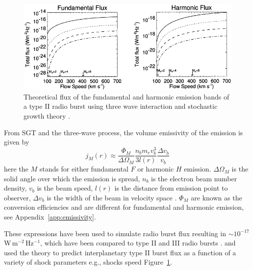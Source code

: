 \begin{figure}[t!]
\begin{center}
\includegraphics[scale=1.1, trim=0cm 0cm 0cm 0.5cm]{images/Cairns2003.pdf}
\caption[Theoretically predicted radio burst fluxes]{Theoretical flux of the fundamental and harmonic emission bands of a type II radio burst using three wave interaction and stochastic growth theory \citet{cairns2003}.}
\label{fig:cairns_emissivity}
\end{center}
\end{figure}
From SGT and the three-wave process, the volume emissivity of the emission is given by
\begin{equation}
j_M(r) \approx \frac{\Phi_M}{\Delta\Omega_M}\frac{n_b m_e v_b^3}{3l(r)}\frac{\Delta v_b}{v_b}
\label{eqn:plasma_emiss}
\end{equation}
here the $M$ stands for either fundamental $F$ or harmonic $H$ emission. $\Delta\Omega_M$ is the solid angle over which the  emission is spread, $n_b$ is the electron beam number density, $v_b$ is the beam speed, $l(r)$ is the distance from emission point to observer, $\Delta v_b$ is the width of the beam in velocity space \citep{robinson1993a, robinson1998}. $\Phi_M$ are known as the conversion efficiencies and are different for fundamental and harmonic emission, see Appendix~\ref{app:emissivity}.

These expressions have been used to simulate radio burst flux resulting in $\sim10^{-17}$\,W\,m$^{-2}$\,Hz$^{-1}$, which have been compared to type II and III radio bursts \citep{schmidt2012, knock2001}. \citet{knock2003} and \citet{cairns2003} used the theory to predict interplanetary type II burst flux as a function of a variety of shock parameters e.g., shocks speed Figure~\ref{fig:cairns_emissivity}.

